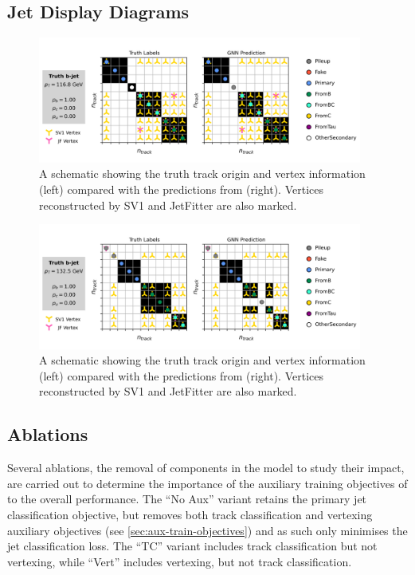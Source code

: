 \subsection{Jet Display Diagrams}

\begin{figure}[!p]
    \centering
    \includegraphics[width=0.95\textwidth]{chapters/gnn_tagger/figs/bjet_vertex.pdf}
    \caption{
        A schematic showing the truth track origin and vertex information (left) compared with the predictions from \GNN (right).
        Vertices reconstructed by SV1 and JetFitter are also marked.
    }
    \label{fig:bjet_diag_1}
 \end{figure}


 \begin{figure}[!p]
    \centering
    \includegraphics[width=0.95\textwidth]{chapters/gnn_tagger/figs/bjet_vertex2.pdf}
    \caption{
        A schematic showing the truth track origin and vertex information (left) compared with the predictions from \GNN (right).
        Vertices reconstructed by SV1 and JetFitter are also marked.
    }
    \label{fig:bjet_diag_2}
 \end{figure}

 

\subsection{Ablations}\label{sec:gnn_ablations}

Several ablations, the removal of components in the model to study their impact, are carried out to determine the importance of the auxiliary training objectives of \GNN to the overall performance.
The ``\GNN No Aux'' variant retains the primary jet classification objective, but removes both track classification and vertexing auxiliary objectives (see \cref{sec:aux-train-objectives}) and as such only minimises the jet classification loss.
The ``\GNN TC'' variant includes track classification but not vertexing, while ``\GNN Vert'' includes vertexing, but not track classification.

